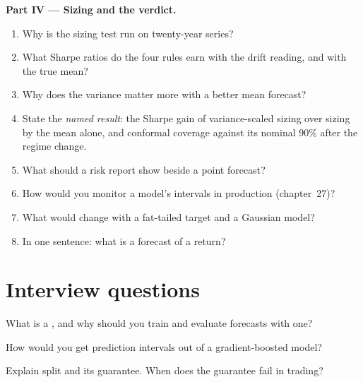 \begin{problem}
\medskip\noindent\textbf{Part IV --- Sizing and the verdict.}
\begin{enumerate}[resume]
\item Why is the sizing test run on twenty-year series?
\item What Sharpe ratios do the four rules earn with the drift reading, and with the true mean?
\item Why does the variance matter more with a better mean forecast?
\item State the \emph{named result}: the Sharpe gain of variance-scaled sizing over sizing by the mean alone, and conformal
coverage against its nominal 90\% after the regime change.
\item What should a risk report show beside a point forecast?
\item How would you monitor a model's intervals in production (chapter~27)?
\item What would change with a fat-tailed target and a Gaussian model?
\item In one sentence: what is a forecast of a return?
\end{enumerate}
\end{problem}

\section{Interview questions}

\begin{interviewq}\label{iq:ml:probabilistic-models-and-uncertainty:1}
What is a , and why should you train and evaluate forecasts with one?
\end{interviewq}

\begin{interviewq}\label{iq:ml:probabilistic-models-and-uncertainty:2}
How would you get prediction intervals out of a gradient-boosted model?
\end{interviewq}

\begin{interviewq}\label{iq:ml:probabilistic-models-and-uncertainty:3}
Explain split  and its guarantee. When does the guarantee fail in trading?
\end{interviewq}

